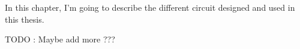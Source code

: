 
\label{cap:circuit}

In this chapter, I'm going to describe the different circuit designed and used in this thesis.

TODO : Maybe add more ???




\cleardoublepage
